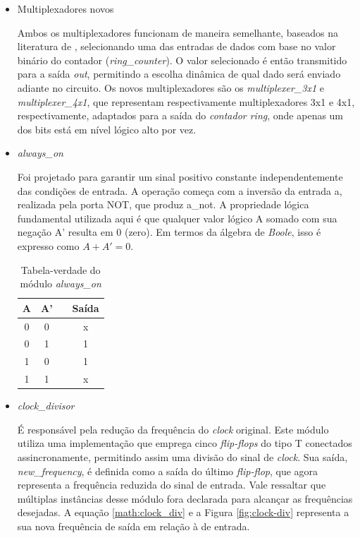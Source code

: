 \documentclass[
	article,			%
	11pt,				%
	oneside,			%
	a4paper,			%
	english,			%
	brazil,				%
	sumario=tradicional
	]{abntex2}
\begin{document}
\begin{itemize}
    \item Multiplexadores novos

    Ambos os multiplexadores funcionam de maneira semelhante, baseados na literatura de \cite{floyd_2007_lgebra}, selecionando uma das entradas de dados com base no valor binário do contador (\textit{ring\_counter}). O valor selecionado é então transmitido para a saída \textit{out}, permitindo a escolha dinâmica de qual dado será enviado adiante no circuito. Os novos multiplexadores são os \textit{multiplexer\_3x1} e \textit{multiplexer\_4x1}, que representam respectivamente multiplexadores 3x1 e 4x1, respectivamente, adaptados para a saída do \textit{contador ring}, onde apenas um dos bits está em nível lógico alto por vez.
    
    \item  \textit{always\_on}

Foi projetado para garantir um sinal positivo constante independentemente das condições de entrada. A operação começa com a inversão da entrada a, realizada pela porta NOT, que produz a\_not. A propriedade lógica fundamental utilizada aqui é que qualquer valor lógico A somado com sua negação A' resulta em 0 (zero). Em termos da álgebra de \textit{Boole}, isso é expresso como \(A + A' = 0\).


\begin{table}[h]
    \centering
    \begin{tabular}{|c|c|>{\centering\arraybackslash}p{2mm}|c|} \hline 
         A&  A'&  & Saída\\ \hline 
         0&  0&  & x\\ \hline 
         0&  1&  & 1\\ \hline 
         1&  0&  & 1\\ \hline 
         1&  1&  & x\\ \hline
    \end{tabular}
    \caption{Tabela-verdade do módulo \textit{always_on}}
    \label{tab:always_on}
\end{table}

    
    \item \textit{clock\_divisor}

 É responsável pela redução da frequência do \textit{clock} original. Este módulo utiliza uma implementação que emprega cinco \textit{flip-flops} do tipo T conectados assincronamente, permitindo assim uma divisão do sinal de \textit{clock}. Sua saída, \textit{new\_frequency}, é definida como a saída do último \textit{flip-flop}, que agora representa a frequência reduzida do sinal de entrada. Vale ressaltar que múltiplas instâncias desse módulo fora declarada para alcançar as frequências desejadas. A equação \ref{math:clock_div} e a Figura \ref{fig:clock-div} representa a sua nova frequência de saída em relação à de entrada.


\end{itemize}
\end{document}
